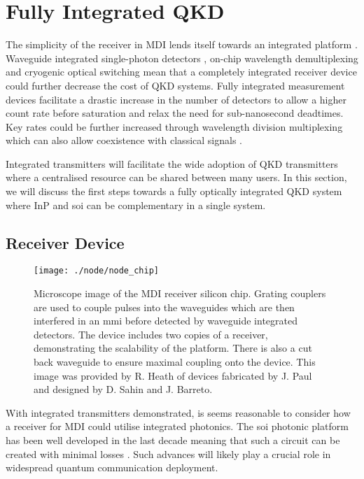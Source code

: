 \section{Fully Integrated QKD}

The simplicity of the receiver in \ac{MDI} lends itself towards an integrated platform \cite{wang2019}. Waveguide integrated single-photon detectors \cite{sprengers2011}, on-chip wavelength demultiplexing \cite{sugita2000} and cryogenic optical switching \cite{eltes2019} mean that a completely integrated receiver device could further decrease the cost of \ac{QKD} systems. Fully integrated measurement devices facilitate a drastic increase in the number of detectors to allow a higher count rate before saturation and relax the need for sub-nanosecond deadtimes. Key rates could be further increased through wavelength division multiplexing which can also allow coexistence with classical signals \cite{price2018}. 


Integrated transmitters will facilitate the wide adoption of \ac{QKD} transmitters where a centralised resource can be shared between many users. In this section, we will discuss the first steps towards a fully optically integrated \ac{QKD} system where \ac{InP} and \ac{soi} can be complementary in a single system.

\subsection{Receiver Device}

\begin{figure}[tbp]
	\centering
	\texttt{[image: ./node/node\_chip]}
	\caption[Silicon MDI-QKD receiver with waveguide integrated detectors]{Microscope image of the \ac{MDI} receiver silicon chip. Grating couplers are used to couple pulses into the waveguides which are then interfered in an \ac{mmi} before detected by waveguide integrated detectors. The device includes two copies of a receiver, demonstrating the scalability of the platform. There is also a cut back waveguide to ensure maximal coupling onto the device. This image was provided by R. Heath of devices fabricated by J. Paul and designed by D. Sahin and J. Barreto.}
	\label{fig:node_chip}
\end{figure}

With integrated transmitters demonstrated, is seems reasonable to consider how a receiver for \ac{MDI} could utilise integrated photonics. The \ac{soi} photonic platform has been well developed in the last decade meaning that such a circuit can be created with minimal losses \cite{wang2019integrated}. Such advances will likely play a crucial role in widespread quantum communication deployment.


